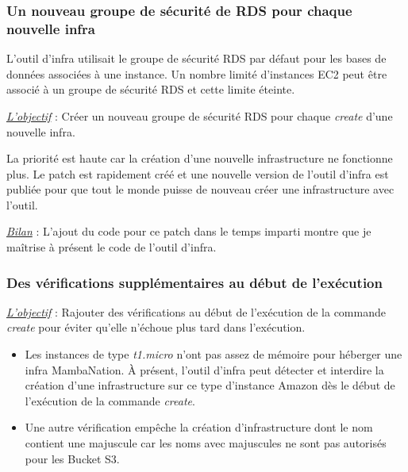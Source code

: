
\subsubsection{Un nouveau groupe de sécurité de RDS pour chaque nouvelle infra}

L'outil d'infra utilisait le groupe de sécurité RDS par défaut pour les bases de
données associées à une instance. Un nombre limité d'instances EC2 peut être
associé à un groupe de sécurité RDS et cette limite éteinte.

\underline{\textit{L'objectif}} : Créer un nouveau groupe de sécurité RDS pour chaque
\textit{create} d'une nouvelle infra. 

La priorité est haute car la création d'une nouvelle infrastructure ne
fonctionne plus. Le patch est rapidement créé et une nouvelle version de l'outil
d'infra est publiée pour que tout le monde puisse de nouveau créer une
infrastructure avec l'outil.

\underline{\textit{Bilan}} : L'ajout du code pour ce patch dans le temps imparti
montre que je maîtrise à présent le code de l'outil d'infra.



\subsubsection{Des vérifications supplémentaires au début de l'exécution}

\underline{\textit{L'objectif}} : Rajouter des vérifications au début de
l'exécution de la commande \textit{create} pour éviter qu'elle n'échoue plus
tard dans l'exécution.

\begin{itemize}
\item[\textbullet] Les instances de type \textit{t1.micro} n'ont pas assez de
  mémoire pour héberger une infra MambaNation.
  À présent, l'outil d'infra peut détecter et interdire la création d'une
  infrastructure sur ce type d'instance Amazon dès le début de l'exécution de la
  commande \textit{create}.
\item[\textbullet] Une autre vérification empêche la création d'infrastructure
  dont le nom contient une majuscule car les noms avec majuscules ne sont pas
  autorisés pour les Bucket S3.
\end{itemize}


